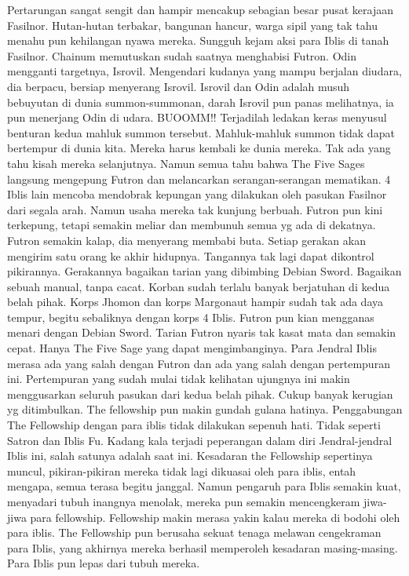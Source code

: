 \documentclass[a4paper,11pt,final]{article}
\begin{document}
Pertarungan sangat sengit dan hampir mencakup sebagian besar pusat kerajaan Fasilnor. Hutan-hutan terbakar, bangunan hancur, warga sipil yang tak tahu menahu pun kehilangan nyawa mereka. Sungguh kejam aksi para Iblis di tanah Fasilnor.
Chainum memutuskan sudah saatnya menghabisi Futron. Odin mengganti targetnya, Isrovil. Mengendari kudanya yang mampu berjalan diudara, dia berpacu, bersiap menyerang Isrovil.
Isrovil dan Odin adalah musuh bebuyutan di dunia summon-summonan, darah Isrovil pun panas melihatnya, ia pun menerjang Odin di udara. BUOOMM!! Terjadilah ledakan keras menyusul benturan kedua mahluk summon tersebut.
Mahluk-mahluk summon tidak dapat bertempur di dunia kita. Mereka harus kembali ke dunia mereka. Tak ada yang tahu kisah mereka selanjutnya. Namun semua tahu bahwa The Five Sages langsung mengepung Futron dan melancarkan serangan-serangan mematikan.
4 Iblis lain mencoba mendobrak kepungan yang dilakukan oleh pasukan Fasilnor dari segala arah. Namun usaha mereka tak kunjung berbuah. Futron pun kini terkepung, tetapi semakin meliar dan membunuh semua yg ada di dekatnya.
Futron semakin kalap, dia menyerang membabi buta. Setiap gerakan akan mengirim satu orang ke akhir hidupnya. Tangannya tak lagi dapat dikontrol pikirannya. Gerakannya bagaikan tarian yang dibimbing Debian Sword. Bagaikan sebuah manual, tanpa cacat.
Korban sudah terlalu banyak berjatuhan di kedua belah pihak. Korps Jhomon dan korps Margonaut hampir sudah tak ada daya tempur, begitu sebaliknya dengan korps 4 Iblis. Futron pun kian mengganas menari dengan Debian Sword.
Tarian Futron nyaris tak kasat mata dan semakin cepat. Hanya The Five Sage yang dapat mengimbanginya. Para Jendral Iblis merasa ada yang salah dengan Futron dan ada yang salah dengan pertempuran ini.
Pertempuran yang sudah mulai tidak kelihatan ujungnya ini makin menggusarkan seluruh pasukan dari kedua belah pihak. Cukup banyak kerugian yg ditimbulkan. The fellowship pun makin gundah gulana hatinya.
Penggabungan The Fellowship dengan para iblis tidak dilakukan sepenuh hati. Tidak seperti Satron dan Iblis Fu. Kadang kala terjadi peperangan dalam diri Jendral-jendral Iblis ini, salah satunya adalah saat ini.
Kesadaran the Fellowship sepertinya muncul, pikiran-pikiran mereka tidak lagi dikuasai oleh para iblis, entah mengapa, semua terasa begitu janggal.
Namun pengaruh para Iblis semakin kuat, menyadari tubuh inangnya menolak, mereka pun semakin mencengkeram jiwa-jiwa para fellowship.
Fellowship makin merasa yakin kalau mereka di bodohi oleh para iblis. The Fellowship pun berusaha sekuat tenaga melawan cengekraman para Iblis, yang akhirnya mereka berhasil memperoleh kesadaran masing-masing. Para Iblis pun lepas dari tubuh mereka.
\end{document}
